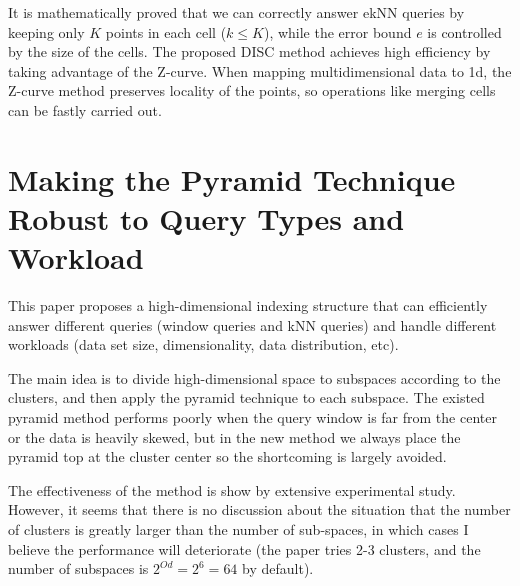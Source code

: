 \documentclass[paper=a4, fontsize=18pt]{article} %
\numberwithin{equation}{section} %
\numberwithin{figure}{section} %
\numberwithin{table}{section} %
\begin{document}
It is mathematically proved that we can correctly answer ekNN queries by keeping only $K$ points in each cell ($k \leq K$), while the error bound $e$ is controlled by the size of the cells. The proposed DISC method achieves high efficiency by taking advantage of the Z-curve. When mapping multidimensional data to 1d, the Z-curve method preserves locality of the points, so operations like merging cells can be fastly carried out.

\section{Making the Pyramid Technique Robust to Query Types and Workload \cite{ZOT04}}

This paper proposes a high-dimensional indexing structure that can efficiently answer different queries (window queries and kNN queries) and handle different workloads (data set size, dimensionality, data distribution, etc).

The main idea is to divide high-dimensional space to subspaces according to the clusters, and then apply the pyramid technique to each subspace. The existed pyramid method performs poorly when the query window is far from the center or the data is heavily skewed, but in the new method we always place the pyramid top at the cluster center so the shortcoming is largely avoided.

The effectiveness of the method is show by extensive experimental study. However, it seems that there is no discussion about the situation that the number of clusters is greatly larger than the number of sub-spaces, in which cases I believe the performance will deteriorate (the paper tries 2-3 clusters, and the number of subspaces is $2^{Od} = 2^6 =64$ by default).


%

\end{document}
